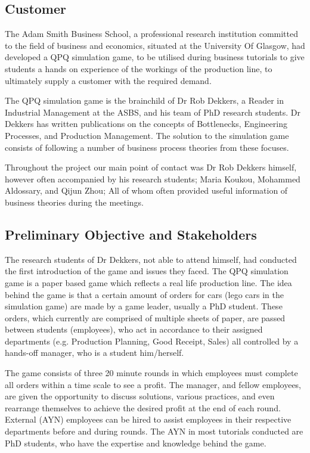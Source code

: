 \documentclass{l3proj}
\begin{document}
\subsection{Customer}

The Adam Smith Business School, a professional research institution committed to the field of business and economics, situated at the University Of Glasgow, had developed a QPQ simulation game, to be utilised during business tutorials to give students a hands on experience of the workings of the production line, to ultimately supply a customer with the required demand.

The QPQ simulation game is the brainchild of Dr Rob Dekkers, a Reader in Industrial Management at the ASBS, and his team of PhD research students. Dr Dekkers has written publications on the concepts of Bottlenecks, Engineering Processes, and Production Management. The solution to the simulation game consists of following a number of business process theories from these focuses.

Throughout the project our main point of contact was Dr Rob Dekkers himself, however often accompanied by his research students; Maria Koukou, Mohammed Aldossary, and Qijun Zhou; All of whom often provided useful information of business theories during the meetings.

\subsection{Preliminary Objective and Stakeholders}
The research students of Dr Dekkers, not able to attend himself, had conducted the first introduction of the game and issues they faced. The QPQ simulation game is a paper based game which reflects a real life production line. The idea behind the game is that a certain amount of orders for cars (lego cars in the simulation game) are made by a game leader, usually a PhD student. These orders, which currently are comprised of multiple sheets of paper, are passed between students (employees), who act in accordance to their assigned departments (e.g. Production Planning, Good Receipt, Sales) all controlled by a hands-off manager, who is a student him/herself. 

The game consists of three 20 minute rounds in which employees must complete all orders within a time scale to see a profit. The manager, and fellow employees, are given the opportunity to discuss solutions, various practices, and even rearrange themselves to achieve the desired profit at the end of each round. External (AYN) employees can be hired to assist employees in their respective departments before and during rounds. The AYN in most tutorials conducted are PhD students, who have the expertise and knowledge behind the game.
\end{document}
